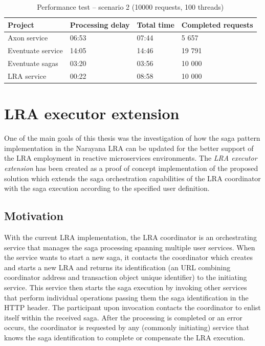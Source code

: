 \documentclass[oneside,
  digital, %
  table,   %
  nolof,     %
  nolot,     %
]{fithesis3}
\begin{document}
\begin{table}[h]
    \begin{tabularx}{\textwidth}{lXXX}
        \toprule
        Project & Processing delay & Total time & Completed requests \\
        \midrule
        Axon service & 06:53 & 07:44 & 5 657 \\
        Eventuate service & 14:05 & 14:46 & 19 791 \\
        Eventuate sagas & 03:20 & 03:56 & 10 000 \\
        LRA service & 00:22 & 08:58 & 10 000 \\
        \bottomrule
    \end{tabularx}
    \caption{Performance test -- scenario 2 (10000 requests, 100 threads)}
    \label{tab:performance-scenario-2}
\end{table}

\clearpage
\chapter{LRA executor extension}

One of the main goals of this thesis was the investigation of how the saga pattern implementation in the Narayana LRA can be updated for the better support of the LRA employment in reactive microservices environments. The \textit{LRA executor extension} has been created as a proof of concept implementation of the proposed solution which extends the saga orchestration capabilities of the LRA coordinator with the saga execution according to the specified user definition.

\section{Motivation}

With the current LRA implementation, the LRA coordinator is an orchestrating service that manages the saga processing spanning multiple user services. When the service wants to start a new saga, it contacts the coordinator which creates and starts a new LRA and returns its identification (an URL combining coordinator address and transaction object unique identifier) to the initiating service. This service then starts the saga execution by invoking other services that perform individual operations passing them the saga identification in the HTTP header. The participant upon invocation contacts the coordinator to enlist itself within the received saga. After the processing is completed or an error occurs, the coordinator is requested by any (commonly initiating) service that knows the saga identification to complete or compensate the LRA execution.
\end{document}
